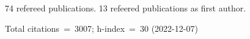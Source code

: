 74 refereed publications. 13 refeered publications as first author.

Total citations~=~3007; h-index~=~30 (2022-12-07)